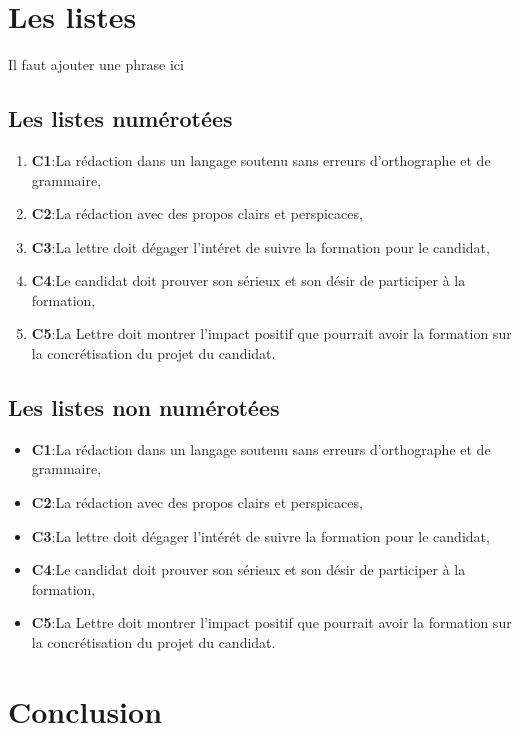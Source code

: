 \section{Les listes}
Il faut ajouter une phrase ici
\subsection{Les listes numérotées}

\begin{enumerate}

\item \textbf{C1}:La rédaction dans un langage soutenu sans erreurs d'orthographe et de grammaire,
\item \textbf{C2}:La rédaction avec des propos clairs et perspicaces,
\item \textbf{C3}:La lettre doit dégager l'intéret de suivre la formation pour le candidat,
\item \textbf{C4}:Le candidat doit prouver son sérieux et son désir de participer à la formation, 
\item \textbf{C5}:La Lettre doit montrer l'impact positif que pourrait avoir la formation sur la concrétisation du projet du candidat.
\end{enumerate}

\subsection{Les listes non numérotées}

\begin{itemize}

\item \textbf{C1}:La rédaction dans un langage soutenu sans erreurs d'orthographe et de grammaire,
\item \textbf{C2}:La rédaction avec des propos clairs et perspicaces,
\item \textbf{C3}:La lettre doit dégager l'intérét de suivre la formation pour le candidat,
\item \textbf{C4}:Le candidat doit prouver son sérieux et son désir de participer à la formation, 
\item \textbf{C5}:La Lettre doit montrer l'impact positif que pourrait avoir la formation sur la concrétisation du projet du candidat.
\end{itemize}

\section{Conclusion}

